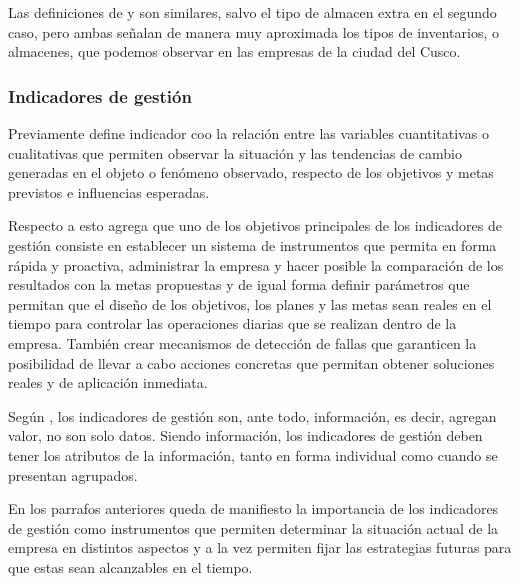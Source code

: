 Las definiciones de \cite{meza} y \citep{chapman} son similares, salvo el tipo de
almacen extra en el segundo caso, pero ambas señalan de manera muy aproximada los
tipos de inventarios, o almacenes, que podemos observar en las empresas de la ciudad
del Cusco.

\subsubsection{Indicadores de gestión}
Previamente \cite{beltran} define indicador coo la relación entre las variables
cuantitativas o cualitativas que permiten observar la situación y las tendencias
de cambio generadas en el objeto o fenómeno observado, respecto de los objetivos
y metas previstos e influencias esperadas.

Respecto a esto \cite{silva} agrega que uno de los objetivos principales de los
indicadores de gestión consiste en establecer un sistema de instrumentos que
permita en forma rápida y proactiva, administrar la empresa y hacer posible la
comparación de los resultados con la metas propuestas y de igual forma definir
parámetros que permitan que el diseño de los objetivos, los planes y las metas sean
reales en el tiempo para controlar las operaciones diarias que se realizan dentro
de la empresa. También crear mecanismos de detección de fallas que garanticen
la posibilidad de llevar a cabo acciones concretas que permitan obtener soluciones
reales y de aplicación inmediata.

Según \cite{beltran}, los indicadores de gestión son, ante todo, información, es
decir, agregan valor, no son solo datos. Siendo información, los indicadores de
gestión deben tener los atributos de la información, tanto en forma individual
como cuando se presentan agrupados.

En los parrafos anteriores queda de manifiesto la importancia de los indicadores
de gestión como instrumentos que permiten determinar la situación actual de la
empresa en distintos aspectos y a la vez permiten fijar las estrategias futuras
para que estas sean alcanzables en el tiempo.

